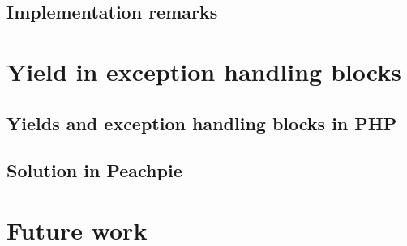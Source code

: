 \subsection{Implementation remarks}

\section{Yield in exception handling blocks}

\subsection{Yields and exception handling blocks in PHP}

\subsection{Solution in Peachpie}

\section{Future work}